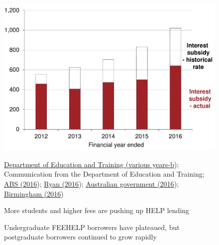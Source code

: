 \documentclass[embargoed]{grattan}
\begin{document}
{\begin{figure}
\caption[More students and higher fees are pushing up {HELP} lending]{More students and higher fees are pushing up \gls{HELP} lending}\label{fig:fig4-more-students-higher-fees-are-pushing-up-HELP-lending}
\includegraphics[page=4]{atlas/Chartpack.pdf}

%
{\protect\hyperlink{_ENREF_36}{Department of Education and Training (various years-b}); Communication from the Department of Education and Training; \protect\hyperlink{_ENREF_6}{ABS (2016}); \protect\hyperlink{_ENREF_71}{Ryan (2016}); \protect\hyperlink{_ENREF_13}{Australian government (2016}); \protect\hyperlink{_ENREF_12}{Birmingham (2016})}
\end{figure}

\begin{figure}
\caption[Undergraduate FEE-HELP borrowers have plateaued, but postgraduate borrowers continued to grow rapidly]{Undergraduate \gls{FEEHELP} borrowers have plateaued, but postgraduate borrowers continued to grow rapidly}\label{fig:fig5-undergrad-HELP-borrowers-have-plateaued-but-postgrad-borrowers-continued-to-grow-rapidly}


\end{figure}}
\end{document}
